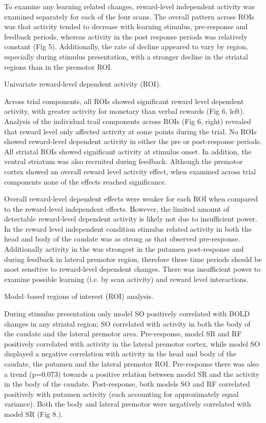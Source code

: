 To examine any learning related changes, reward-level independent activity was examined separately for each of the four scans.  The overall pattern across ROIs was that activity tended to decrease with learning stimulus, pre-response and feedback periods, whereas activity in the post response periods was relatively constant (Fig 5).  Additionally, the rate of decline appeared to vary by region, especially during stimulus presentation, with a stronger decline in the striatal regions than in the premotor ROI.



Univariate reward-level dependent activity (ROI).  

Across trial components, all ROIs showed significant reward level dependent activity, with greater activity for monetary than verbal rewards (Fig 6, left).  Analysis of the individual trail components across ROIs (Fig 6, right) revealed that reward level only affected activity at some points during the trial. No ROIs showed reward-level dependent activity in either the pre or post-response periods.  All striatal ROIs showed significant activity at stimulus onset.  In addition, the ventral striatum was also recruited during feedback.  Although the premotor cortex showed an overall reward level activity effect, when examined across trial components none of the effects reached significance. 

Overall reward-level dependent effects were weaker for each ROI when compared to the reward-level independent effects.   However, the limited amount of detectable reward-level dependent activity is likely not due to insufficient power. In the reward level independent condition stimulus related activity in both the head and body of the caudate was as strong as that observed pre-response.  Additionally activity in the was strongest in the putamen post-response and during feedback in lateral premotor region, therefore these time periods should be most sensitive to reward-level dependent changes.  There was insufficient power to examine possible learning (i.e. by scan activity) and reward level interactions.



Model–based regions of interest (ROI) analysis.

During stimulus presentation only model SO positively correlated with BOLD changes in any striatal region; SO correlated with activity in both the body of the caudate and the lateral premotor area.  Pre-response,  model SR and RF positively correlated with activity in the lateral premotor cortex, while model SO displayed a negative correlation with activity in the head and body of the caudate, the putamen and the lateral premotor ROI. Pre-response there was also a trend (p=0.073) towards a positive relation between model SR and the activity in the body of the caudate.  Post-response,  both models SO and RF correlated positively with putamen activity (each accounting for approximately equal variance).  Both the body and lateral premotor were negatively correlated with model SR (Fig 8.). 

